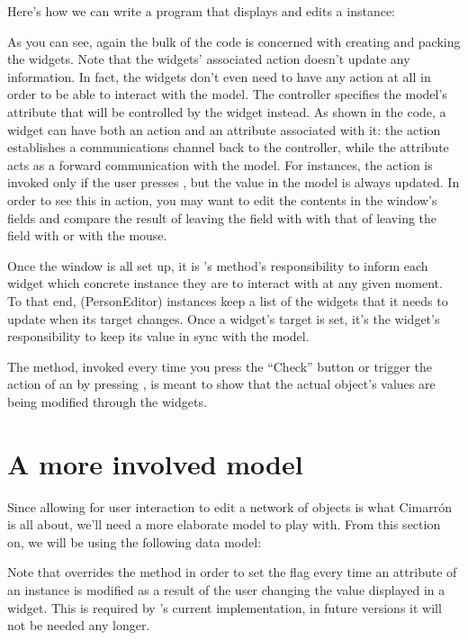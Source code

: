 \documentclass[a4paper]{howto}
\newcommand{\Cimarron}[0]{Cimarrón}
\begin{document}
Here's how we can write a program that displays and edits a
 instance:



As you can see, again the bulk of the code is concerned with creating
and packing the widgets. Note that the  widgets' associated
action doesn't update any information. In fact, the widgets don't even
need to have any action at all in order to be able to interact with the
model. The controller specifies the model's attribute that will be
controlled by the widget instead. As shown in the code, a widget can
have both an action and an attribute associated with it: the action
establishes a communications channel back to the controller, while the
attribute acts as a forward communication with the model. For
 instances, the action is invoked only if the user presses
, but the value in the model is always updated. In order to
see this in action, you may want to edit the contents in the window's
fields and compare the result of leaving the field with  with
that of leaving the field with  or with the mouse.

Once the window is all set up, it is 's
 method's responsibility to inform each widget which
concrete instance they are to interact with at any given moment. To that
end, \class(PersonEditor) instances keep a list of the widgets that it
needs to update when its target changes. Once a widget's target is set,
it's the widget's responsibility to keep its value in sync with the
model.

The  method, invoked every time you press the
``Check'' button or trigger the action of an  by pressing
, is meant to show that the actual  object's
values are being modified through the widgets.

\section{A more involved model}

Since allowing for user interaction to edit a network of objects is what
\Cimarron{} is all about, we'll need a more elaborate model to play
with. From this section on, we will be using the following data model:



Note that  overrides the  method in
order to set the  flag every time an attribute of an
instance is modified as a result of the user changing the value
displayed in a widget. This is required by 's current
implementation, in future versions it will not be needed any longer.
\end{document}
